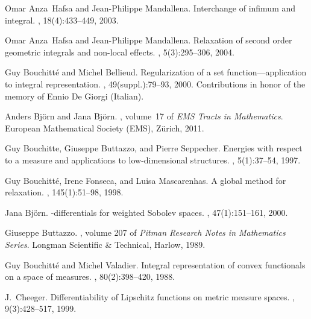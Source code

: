 \documentclass[10pt]{amsart}
\numberwithin{equation}{section}
\theoremstyle{definition}
\theoremstyle{remark}
\begin{document}
\begin{thebibliography}{AHM04}

Omar Anza~Hafsa and Jean-Philippe Mandallena.
\newblock Interchange of infimum and integral.
, 18(4):433--449,
  2003.

Omar Anza~Hafsa and Jean-Philippe Mandallena.
\newblock Relaxation of second order geometric integrals and non-local effects.
, 5(3):295--306, 2004.

Guy Bouchitt{\'e} and Michel Bellieud.
\newblock Regularization of a set function---application to integral
  representation.
, 49(suppl.):79--93, 2000.
\newblock Contributions in honor of the memory of Ennio De Giorgi (Italian).

Anders Bj{\"o}rn and Jana Bj{\"o}rn.
, volume~17 of {\em
  EMS Tracts in Mathematics}.
\newblock European Mathematical Society (EMS), Z\"urich, 2011.

Guy Bouchitte, Giuseppe Buttazzo, and Pierre Seppecher.
\newblock Energies with respect to a measure and applications to
  low-dimensional structures.
, 5(1):37--54, 1997.

Guy Bouchitt{\'e}, Irene Fonseca, and Luisa Mascarenhas.
\newblock A global method for relaxation.
, 145(1):51--98, 1998.

Jana Bj{\"o}rn.
-differentials for weighted {S}obolev spaces.
, 47(1):151--161, 2000.

Giuseppe Buttazzo.
, volume 207 of {\em Pitman Research Notes in
  Mathematics Series}.
\newblock Longman Scientific \& Technical, Harlow, 1989.

Guy Bouchitt{\'e} and Michel Valadier.
\newblock Integral representation of convex functionals on a space of measures.
, 80(2):398--420, 1988.

J.~Cheeger.
\newblock Differentiability of {L}ipschitz functions on metric measure spaces.
, 9(3):428--517, 1999.


\end{thebibliography}
\end{document}
